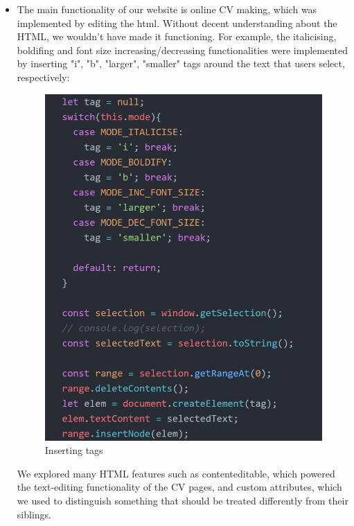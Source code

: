 \documentclass[11pt]{article}
\begin{document}
\begin{spacing}{1.0}
\begin{itemize}
	\item The main functionality of our website is online CV making, which was implemented by editing the html. Without decent understanding about the HTML, we wouldn’t have made it functioning.
	For example, the italicising, boldifing and font size increasing/decreasing functionalities were implemented by inserting "i", "b", "larger", "smaller" tags around the text that users select, respectively:
	\begin{figure}[H]
	\centering
	\includegraphics[scale=.5]{figures/html/3_insertTag.jpg}
	\caption{Inserting tags}
	\end{figure}
		
	We explored many HTML features such as contenteditable, which powered the text-editing functionality of the CV pages, and custom attributes, which we used to distinguish something that should be treated differently from their siblings.
	

\end{itemize}
\end{spacing}
\end{document}
